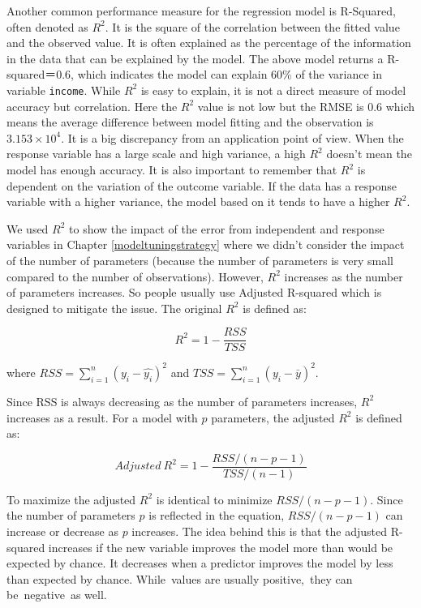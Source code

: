 \documentclass[12pt,]{krantz}
\begin{document}
Another common performance measure for the regression model is R-Squared, often denoted as \(R^2\). It is the square of the correlation between the fitted value and the observed value. It is often explained as the percentage of the information in the data that can be explained by the model. The above model returns a R-squared＝0.6, which indicates the model can explain 60\% of the variance in variable \texttt{income}. While \(R^2\) is easy to explain, it is not a direct measure of model accuracy but correlation. Here the \(R^2\) value is not low but the RMSE is 0.6 which means the average difference between model fitting and the observation is \ensuremath{3.153\times 10^{4}}. It is a big discrepancy from an application point of view. When the response variable has a large scale and high variance, a high \(R^2\) doesn't mean the model has enough accuracy. It is also important to remember that \(R^2\) is dependent on the variation of the outcome variable. If the data has a response variable with a higher variance, the model based on it tends to have a higher \(R^2\).

We used \(R^2\) to show the impact of the error from independent and response variables in Chapter \ref{modeltuningstrategy} where we didn't consider the impact of the number of parameters (because the number of parameters is very small compared to the number of observations). However, \(R^2\) increases as the number of parameters increases. So people usually use Adjusted R-squared which is designed to mitigate the issue. The original \(R^2\) is defined as:

\[R^{2}=1-\frac{RSS}{TSS}\]

where \(RSS=\sum_{i=1}^{n}(y_{i}-\hat{y_{i}})^{2}\) and \(TSS=\sum_{i=1}^{n}(y_{i}-\bar{y})^{2}\).

Since RSS is always decreasing as the number of parameters increases, \(R^2\) increases as a result. For a model with \(p\) parameters, the adjusted \(R^2\) is defined as:

\[Adjusted\ R^{2}=1-\frac{RSS/(n-p-1)}{TSS/(n-1)}\]

To maximize the adjusted \(R^{2}\) is identical to minimize \(RSS/(n-p-1)\). Since the number of parameters \(p\) is reflected in the equation, \(RSS/(n-p-1)\) can increase or decrease as \(p\) increases. The idea behind this is that the adjusted R-squared increases if the new variable improves the model more than would be expected by chance. It decreases when a predictor improves the model by less than expected by chance. While~values are usually positive,~they can be~negative~as well.
\end{document}
